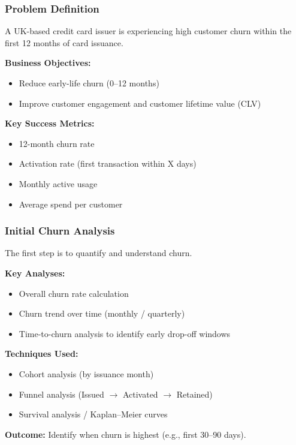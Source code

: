 \documentclass[10pt,a4paper]{article}
\begin{document}
	\subsubsection{Problem Definition}
	
	A UK-based credit card issuer is experiencing high customer churn within the first 12 months of card issuance.
	
	\textbf{Business Objectives:}
	\begin{itemize}
	    \item Reduce early-life churn (0--12 months)
	    \item Improve customer engagement and customer lifetime value (CLV)
	\end{itemize}
	
	\textbf{Key Success Metrics:}
	\begin{itemize}
	    \item 12-month churn rate
	    \item Activation rate (first transaction within X days)
	    \item Monthly active usage
	    \item Average spend per customer
	\end{itemize}
	
	\subsubsection{Initial Churn Analysis}
	
	The first step is to quantify and understand churn.
	
	\textbf{Key Analyses:}
	\begin{itemize}
	    \item Overall churn rate calculation
	    \item Churn trend over time (monthly / quarterly)
	    \item Time-to-churn analysis to identify early drop-off windows
	\end{itemize}
	
	\textbf{Techniques Used:}
	\begin{itemize}
	    \item Cohort analysis (by issuance month)
	    \item Funnel analysis (Issued $\rightarrow$ Activated $\rightarrow$ Retained)
	    \item Survival analysis / Kaplan--Meier curves
	\end{itemize}
	
	\textbf{Outcome:} Identify when churn is highest (e.g., first 30--90 days).
	
\end{document}
